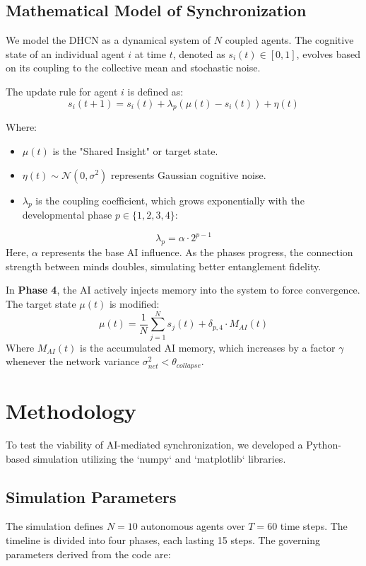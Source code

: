 \documentclass[12pt, letterpaper]{article}
\begin{document}
\subsection{Mathematical Model of Synchronization}
We model the DHCN as a dynamical system of $N$ coupled agents. The cognitive state of an individual agent $i$ at time $t$, denoted as $s_i(t) \in [0, 1]$, evolves based on its coupling to the collective mean and stochastic noise.

The update rule for agent $i$ is defined as:
\begin{equation}
    s_i(t+1) = s_i(t) + \lambda_p (\mu(t) - s_i(t)) + \eta(t)
\end{equation}

Where:
\begin{itemize}
    \item $\mu(t)$ is the "Shared Insight" or target state.
    \item $\eta(t) \sim \mathcal{N}(0, \sigma^2)$ represents Gaussian cognitive noise.
    \item $\lambda_p$ is the coupling coefficient, which grows exponentially with the developmental phase $p \in \{1, 2, 3, 4\}$:
\end{itemize}
\begin{equation}
    \lambda_p = \alpha \cdot 2^{p-1}
\end{equation}
Here, $\alpha$ represents the base AI influence. As the phases progress, the connection strength between minds doubles, simulating better entanglement fidelity.

In \textbf{Phase 4}, the AI actively injects memory into the system to force convergence. The target state $\mu(t)$ is modified:
\begin{equation}
    \mu(t) = \frac{1}{N}\sum_{j=1}^{N} s_j(t) + \delta_{p,4} \cdot M_{AI}(t)
\end{equation}
Where $M_{AI}(t)$ is the accumulated AI memory, which increases by a factor $\gamma$ whenever the network variance $\sigma^2_{net} < \theta_{collapse}$.

\section{Methodology}

To test the viability of AI-mediated synchronization, we developed a Python-based simulation utilizing the `numpy` and `matplotlib` libraries.

\subsection{Simulation Parameters}
The simulation defines $N=10$ autonomous agents over $T=60$ time steps. The timeline is divided into four phases, each lasting 15 steps. The governing parameters derived from the code are:
\end{document}
